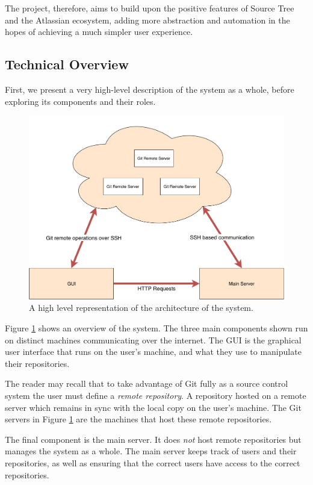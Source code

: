 The project, therefore, aims to build upon the positive features of Source Tree and the Atlassian ecosystem, adding more abstraction and automation in the hopes of achieving a much simpler user experience.


\subsection{Technical Overview}

First, we present a very high-level description of the system as a whole, before exploring its components and their roles.

\begin{figure} 
    \centering
    \includegraphics[scale = 0.5]{figures/highlevel.pdf}
    \caption{A high level representation of the architecture of the system. }
    \label{fig:highlevel}
\end{figure}

Figure \ref{fig:highlevel} shows an overview of the system. The three main components shown run on distinct machines communicating over the internet. The GUI is the graphical user interface that runs on the user's machine, and what they use to manipulate their repositories. 

The reader may recall that to take advantage of Git fully as a source control system the user must define a \emph{remote repository}. A repository hosted on a remote server which remains in sync with the local copy on the user's machine. The Git servers in Figure \ref{fig:highlevel} are the machines that host these remote repositories.

The final component is the main server. It does \emph{not} host remote repositories but manages the system as a whole. The main server keeps track of users and their repositories, as well as ensuring that the correct users have access to the correct repositories. 

